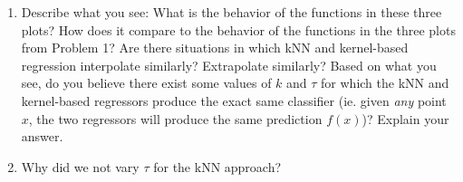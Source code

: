 \documentclass[submit]{harvardml}
\begin{document}
\begin{problem}
\begin{enumerate}
\item Describe what you see: What is the behavior of the functions in
  these three plots?  How does it compare to the behavior of the
  functions in the three plots from Problem 1?  Are there situations
  in which kNN and kernel-based regression interpolate similarly?
  Extrapolate similarly?  Based on what you see, do you believe there
  exist some values of $k$ and $\tau$ for which the kNN and kernel-based regressors produce the exact same classifier (ie. given \textit{any} point $x$, the two regressors will produce the same prediction $f(x)$)? Explain your answer.
  
\item Why did we not vary $\tau$ for the kNN approach?

\end{enumerate}

\end{problem}
\end{document}
